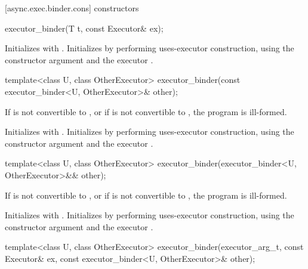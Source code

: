 [async.exec.binder.cons]{ constructors}

\begin{itemdecl}
executor_binder(T t, const Executor& ex);
\end{itemdecl}

\begin{itemdescr}
\pnum
\effects Initializes  with . Initializes  by performing uses-executor construction, using the constructor argument  and the executor .
\end{itemdescr}

\begin{itemdecl}
template<class U, class OtherExecutor>
  executor_binder(const executor_binder<U, OtherExecutor>& other);
\end{itemdecl}

\begin{itemdescr}
\pnum
\requires If  is not convertible to , or if  is not convertible to , the program is ill-formed.

\pnum
\effects Initializes  with . Initializes  by performing uses-executor construction, using the constructor argument  and the executor .
\end{itemdescr}

\begin{itemdecl}
template<class U, class OtherExecutor>
  executor_binder(executor_binder<U, OtherExecutor>&& other);
\end{itemdecl}

\begin{itemdescr}
\pnum
\requires If  is not convertible to , or if  is not convertible to , the program is ill-formed.

\pnum
\effects Initializes  with . Initializes  by performing uses-executor construction, using the constructor argument  and the executor .
\end{itemdescr}

\begin{itemdecl}
template<class U, class OtherExecutor>
  executor_binder(executor_arg_t, const Executor& ex,
    const executor_binder<U, OtherExecutor>& other);
\end{itemdecl}

